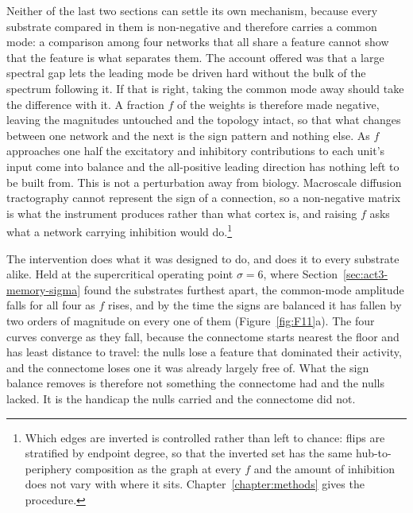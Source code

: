 Neither of the last two sections can settle its own mechanism, because every
substrate compared in them is non-negative and therefore carries a common mode: a
comparison among four networks that all share a feature cannot show that the
feature is what separates them. The account offered was that a large spectral gap
lets the leading mode be driven hard without the bulk of the spectrum following
it. If that is right, taking the common mode away should take the difference with
it. A fraction $f$ of the weights is therefore made negative, leaving the
magnitudes untouched and the topology intact, so that what changes between one
network and the next is the sign pattern and nothing else. As $f$ approaches one
half the excitatory and inhibitory contributions to each unit's input come into
balance and the all-positive leading direction has nothing left to be built from.
This is not a perturbation away from biology. Macroscale diffusion tractography
cannot represent the sign of a connection, so a non-negative matrix is what the
instrument produces rather than what cortex is, and raising $f$ asks what a
network carrying inhibition would do.\footnote{Which edges are inverted is
controlled rather than left to chance: flips are stratified by endpoint
degree, so that the inverted set has the same hub-to-periphery composition as
the graph at every $f$ and the amount of inhibition does not vary with where it
sits. Chapter~\ref{chapter:methods} gives the procedure.}

The intervention does what it was designed to do, and does it to every substrate
alike. Held at the supercritical operating point
$\sigma = 6$, %
where Section~\ref{sec:act3-memory-sigma} found the substrates furthest apart,
the common-mode amplitude falls for all four as $f$ rises, and by the time the
signs are balanced it has fallen by two orders of magnitude on every one of them
(Figure~\ref{fig:F11}a). The four curves converge as they fall, because the
connectome starts nearest the floor and has least distance to travel: the nulls
lose a feature that dominated their activity, and the connectome loses one it was
already largely free of. What the sign balance removes is therefore not something
the connectome had and the nulls lacked. It is the handicap the nulls carried and
the connectome did not.

